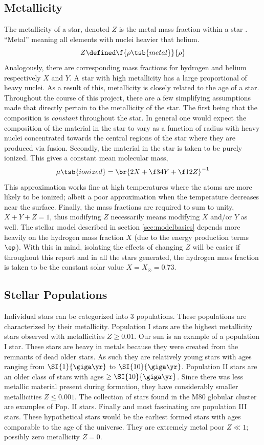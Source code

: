 \documentclass[11pt]{article}
\begin{document}
    \subsection{Metallicity}
    The metallicity of a star, denoted $Z$ is the metal mass fraction within a star \cite{textbook}. ``Metal'' meaning all elements with nuclei heavier that helium.
    \[ Z \defined \f{\rho\tsb{metal}}{\rho} \]
    Analogously, there are corresponding mass fractions for hydrogen and helium respectively $X$ and $Y$. A star with high metallicity has a large proportional of heavy nuclei. As a result of this, metallicity is closely related to the age of a star. Throughout the course of this project, there are a few simplifying assumptions made that directly pertain to the metallicity of the star. The first being that the composition is \textit{constant} throughout the star. In general one would expect the composition of the material in the star to vary as a function of radius with heavy nuclei concentrated towards the central regions of the star where they are produced via fusion. Secondly, the material in the star is taken to be purely ionized. This gives a constant mean molecular mass,
    \[ \mu\tsb{ionized} = \br{2X + \f34 Y + \f12 Z}^{-1} \]
    This approximation works fine at high temperatures where the atoms are more likely to be ionized; albeit a poor approximation when the temperature decreases near the surface. Finally, the mass fractions are required to sum to unity, $X + Y + Z = 1$, thus modifying $Z$ necessarily means modifying $X$ and/or $Y$ as well. The stellar model described in section \ref{sec:modelbasics} depends more heavily on the hydrogen mass fraction $X$ (due to the energy production terms $\ep$). With this in mind, isolating the effects of changing $Z$ will be easier if throughout this report and in all the stars generated, the hydrogen mass fraction is taken to be the constant solar value $X = X_\odot = 0.73$.
    \subsection{Stellar Populations}
    Individual stars can be categorized into 3 populations. These populations are characterized by their metallicity. Population I stars are the highest metallicity stars observed with metallicities $Z \geq 0.01$. Our sun is an example of a population I star. These stars are heavy in metals because they were created from the remnants of dead older stars. As such they are relatively young stars with ages ranging from $\SI{1}{\giga\yr}$ to $\SI{10}{\giga\yr}$. Population II stars are an older class of stars with ages $\geq\SI{10}{\giga\yr}$. Since there was less metallic material  present during formation, they have considerably smaller metallicities $Z \leq 0.001$. The collection of stars found in the M80 globular cluster are examples of Pop. II stars. Finally and most fascinating are population III stars. These hypothetical stars would be the earliest formed stars with ages comparable to the age of the universe. They are extremely metal poor $Z \ll 1$; possibly zero metallicity $Z = 0$. \\
\end{document}
